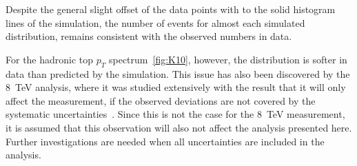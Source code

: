  Despite the general slight offset of the data points with to the solid histogram lines of the simulation, the number of events for almost each simulated distribution, remains consistent with the observed numbers in data.

 For the hadronic top $p_T$ spectrum~\cref{fig:K10}, however, the distribution is softer in data than predicted by the simulation. This issue has also been discovered by the 8~TeV analysis, where it was studied extensively with the result that it will only affect the measurement, if the observed deviations are not covered by the systematic uncertainties~\cite{ATLAS-CONF-2017-071}. Since this is not the case for the 8~TeV measurement, it is assumed that this observation will also not affect the analysis presented here. Further investigations are needed when all  uncertainties are included in the analysis. 




 












